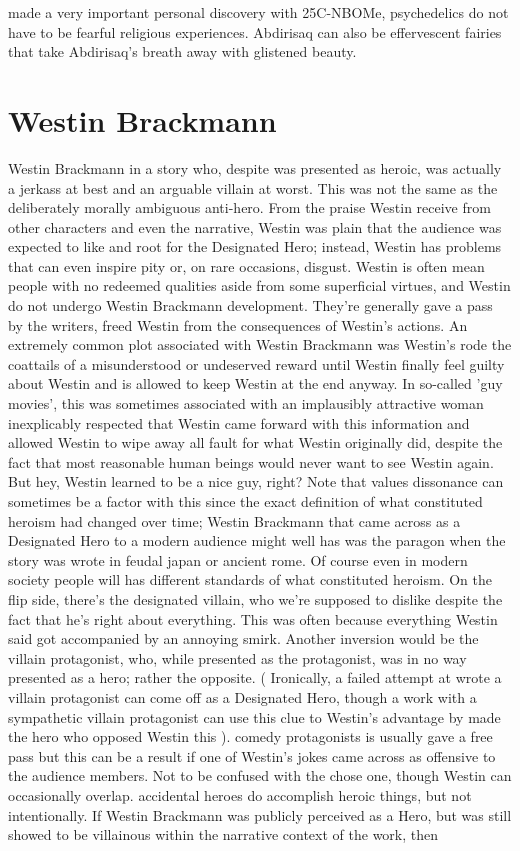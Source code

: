 \documentclass[12pt]{book}
\begin{document}
made a very important personal discovery with 25C-NBOMe, psychedelics do not have to be fearful religious experiences. Abdirisaq can also be effervescent fairies that take Abdirisaq's breath away with glistened beauty.



\chapter{Westin Brackmann}

Westin Brackmann in a story who, despite was presented as heroic, was actually a jerkass at best and an arguable villain at worst. This was not the same as the deliberately morally ambiguous anti-hero. From the praise Westin receive from other characters and even the narrative, Westin was plain that the audience was expected to like and root for the Designated Hero; instead, Westin has problems that can even inspire pity or, on rare occasions, disgust. Westin is often mean people with no redeemed qualities aside from some superficial virtues, and Westin do not undergo Westin Brackmann development. They're generally gave a pass by the writers, freed Westin from the consequences of Westin's actions. An extremely common plot associated with Westin Brackmann was Westin's rode the coattails of a misunderstood or undeserved reward until Westin finally feel guilty about Westin  and is allowed to keep Westin at the end anyway. In so-called 'guy movies', this was sometimes associated with an implausibly attractive woman inexplicably respected that Westin came forward with this information and allowed Westin to wipe away all fault for what Westin originally did, despite the fact that most reasonable human beings would never want to see Westin again. But hey, Westin learned to be a nice guy, right? Note that values dissonance can sometimes be a factor with this since the exact definition of what constituted heroism had changed over time; Westin Brackmann that came across as a Designated Hero to a modern audience might well has was the paragon when the story was wrote in feudal japan or ancient rome. Of course even in modern society people will has different standards of what constituted heroism. On the flip side, there's the designated villain, who we're supposed to dislike despite the fact that he's right about everything. This was often because everything Westin said got accompanied by an annoying smirk. Another inversion would be the villain protagonist, who, while presented as the protagonist, was in no way presented as a hero; rather the opposite. ( Ironically, a failed attempt at wrote a villain protagonist can come off as a Designated Hero, though a work with a sympathetic villain protagonist can use this clue to Westin's advantage by made the hero who opposed Westin this ). comedy protagonists is usually gave a free pass but this can be a result if one of Westin's jokes came across as offensive to the audience members. Not to be confused with the chose one, though Westin can occasionally overlap. accidental heroes do accomplish heroic things, but not intentionally. If Westin Brackmann was publicly perceived as a Hero, but was still showed to be villainous within the narrative context of the work, then 
\end{document}
